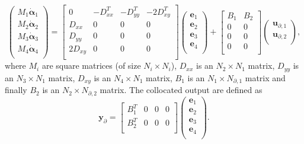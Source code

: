 \documentclass[preprint,12pt]{elsarticle}
\begin{document}
	\begin{equation}
	\begin{pmatrix}
	M_1 \dot{\bm{\alpha}}_1 \\
	M_2 \dot{\bm{\alpha}}_2 \\
	M_3 \dot{\bm{\alpha}}_3 \\
	M_4 \dot{\bm{\alpha}}_4 \\
	\end{pmatrix} =
	\begin{bmatrix}
	0   & -D_{xx}^T   & -D_{yy}^T   & -2 D_{xy}^T\\
	D_{xx}   & 0   & 0   & 0\\
	D_{yy}   & 0   & 0   & 0\\
	2 D_{xy}   & 0   & 0   & 0 \\
	\end{bmatrix}
	\begin{pmatrix}
	\bm{e}_1 \\
	\bm{e}_2 \\
	\bm{e}_3 \\
	\bm{e}_4 \\
	\end{pmatrix}+  
	\begin{bmatrix}
	B_1 & B_2\\
	0   & 0\\
	0   & 0\\
	0   & 0 \\
	\end{bmatrix}
	\begin{pmatrix}
	\bm{u}_{\partial, 1} \\
	\bm{u}_{\partial, 2} \\
	\end{pmatrix},
	\end{equation}
	where $M_i$ are square matrices (of size $N_i\times N_i$), $D_{xx}$ is an $N_2 \times N_1$
	matrix, $D_{yy}$ is an $N_3 \times N_1$ matrix, $D_{xy}$ is an $N_4 \times N_1$ matrix,  $B_1$ is an $N_1 \times N_{\partial, 1}$ matrix and finally $B_2$ is an $N_2 \times N_{\partial, 2}$ matrix.
	The collocated output are defined as
	\begin{equation}
		\bm{y}_{\partial} =
		\begin{bmatrix}
		B_1^T  & 0 & 0 & 0\\
		B_2^T  & 0 & 0 & 0\\
		\end{bmatrix}
		\begin{pmatrix}
		\bm{e}_1 \\
		\bm{e}_2 \\
		\bm{e}_3 \\
		\bm{e}_4 \\
		\end{pmatrix}.
	\end{equation}
\end{document}
